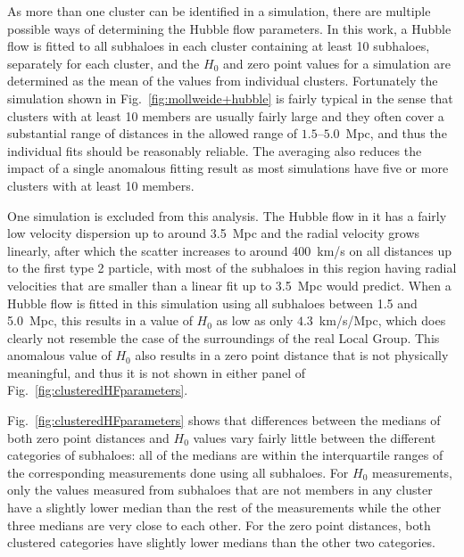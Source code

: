 \documentclass[english, twoside]{HYgradu}
\begin{document}
As more than one cluster can be identified in a simulation, there are multiple possible ways of determining the Hubble flow parameters. In this work, a Hubble flow is fitted to all subhaloes in each cluster containing at least 10 subhaloes, separately for each cluster, and the $H_0$ and zero point values for a simulation are determined as the mean of the values from individual clusters. Fortunately the simulation shown in Fig.~\ref{fig:mollweide+hubble} is fairly typical in the sense that clusters with at least 10 members are usually fairly large and they often cover a substantial range of distances in the allowed range of $1.5$--$5.0$~Mpc, and thus the individual fits should be reasonably reliable. The averaging also reduces the impact of a single anomalous fitting result as most simulations have five or more clusters with at least 10 members.

One simulation is excluded from this analysis. The Hubble flow in it has a fairly low velocity dispersion up to around 3.5~Mpc and the radial velocity grows linearly, after which the scatter increases to around 400~km/s on all distances up to the first type 2 particle, with most of the subhaloes in this region having radial velocities that are smaller than a linear fit up to 3.5~Mpc would predict. When a Hubble flow is fitted in this simulation using all subhaloes between 1.5 and 5.0~Mpc, this results in a value of $H_0$ as low as only $4.3$~km/s/Mpc, which does clearly not resemble the case of the surroundings of the real Local Group. This anomalous value of $H_0$ also results in a zero point distance that is not physically meaningful, and thus it is not shown in either panel of Fig.~\ref{fig:clusteredHFparameters}.

Fig.~\ref{fig:clusteredHFparameters} shows that differences between the medians of both zero point distances and $H_0$ values vary fairly little between the different categories of subhaloes: all of the medians are within the interquartile ranges of the corresponding measurements done using all subhaloes. For $H_0$ measurements, only the values measured from subhaloes that are not members in any cluster have a slightly lower median than the rest of the measurements while the other three medians are very close to each other. For the zero point distances, both clustered categories have slightly lower medians than the other two categories.
\end{document}
